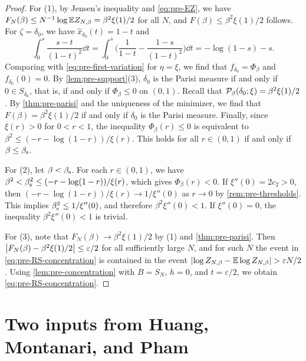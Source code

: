 \begin{proof}
For (1), by Jensen's inequality and \eqref{eq:pre-EZ}, we have $F_N(\beta)\le N^{-1}\log\mathbb E Z_{N,\beta}=\beta^2\xi(1)/2$ for all $N$, and $F(\beta)\le\beta^2\xi(1)/2$ follows. For $\zeta=\delta_0$, we have $\hat x_{\delta_0}(t)=1-t$ and
\[
\int_0^s\frac{s-t}{(1-t)^2}\dd t=\int_0^s\Big(\frac1{1-t}-\frac{1-s}{(1-t)^2}\Big)\dd t=-\log(1-s)-s.
\]
Comparing with \eqref{eq:pre-first-variation} for $\eta=\xi$, we find that $f_{\delta_0}=\Phi_\beta$ and $f_{\delta_0}(0)=0$. By \cref{lem:pre-support}(3), $\delta_0$ is the Parisi measure if and only if $0\in S_{\delta_0}$, that is, if and only if $\Phi_\beta\le0$ on $(0,1)$. Recall that $\mathcal P_\beta(\delta_0;\xi)=\beta^2\xi(1)/2$. By \cref{thm:pre-parisi} and the uniqueness of the minimizer, we find that $F(\beta)=\beta^2\xi(1)/2$ if and only if $\delta_0$ is the Parisi measure. Finally, since $\xi(r)>0$ for $0<r<1$, the inequality $\Phi_\beta(r)\le0$ is equivalent to $\beta^2\le(-r-\log(1-r))/\xi(r)$. This holds for all $r\in(0,1)$ if and only if $\beta\le\beta_{\mathrm s}$.

For (2), let $\beta<\beta_{\mathrm s}$. For each $r\in(0,1)$, we have $\beta^2<\beta_{\mathrm s}^2\le(-r-\log(1-r))/\xi(r)$, which gives $\Phi_\beta(r)<0$. If $\xi''(0)=2c_2>0$, then $(-r-\log(1-r))/\xi(r)\to1/\xi''(0)$ as $r\to0$ by \cref{rem:pre-thresholds}. This implies $\beta_{\mathrm s}^2\le1/\xi''(0)$, and therefore $\beta^2\xi''(0)<1$. If $\xi''(0)=0$, the inequality $\beta^2\xi''(0)<1$ is trivial.

For (3), note that $F_N(\beta)\to\beta^2\xi(1)/2$ by (1) and \cref{thm:pre-parisi}. Then $\left|F_N(\beta)-\beta^2\xi(1)/2\right|\le\varepsilon/2$ for all sufficiently large $N$, and for such $N$ the event in \eqref{eq:pre-RS-concentration} is contained in the event $\abs{\log Z_{N,\beta}-\E\log Z_{N,\beta}}>\varepsilon N/2$. Using \cref{lem:pre-concentration} with $B=S_N$, $h=0$, and $t=\varepsilon/2$, we obtain \eqref{eq:pre-RS-concentration}.
\end{proof}

\section{Two inputs from Huang, Montanari, and Pham}\label{sec:pre-HMP}

